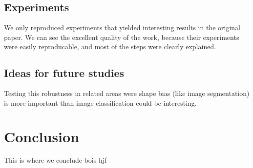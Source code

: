 \documentclass{article}
\begin{document}
\subsection{Experiments}

We only reproduced experiments that yielded interesting results 
in the original paper. We can see the excellent quality of the work, 
because their experiments were easily reproducable, and most of the 
steps were clearly explained.

\subsection{Ideas for future studies}

Testing this robustness in related areas were shape bias (like image segmentation) 
is more important than image classification could be interesting.

\section{Conclusion}

This is where we conclude bois hjf







\end{document}
